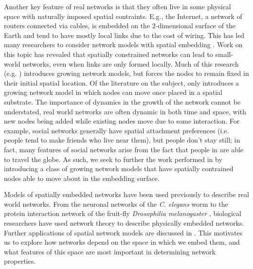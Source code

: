 \documentclass[aps,pre,manuscript,superscriptaddress,amsmath,amssymb,nofootinbib]{revtex4-1}
\begin{document}
Another key feature of real networks is that they often live in some physical space with naturally imposed spatial contraints. 
E.g., the Internet, a network of routers connected via cables, is embedded on the $2$-dimensional surface of the Earth and tend to have mostly local links due to the cost of wiring.
This has led many researchers to consider network models with spatial embedding \cite{ozik2004,przuljgeo,hermannspace,bullockspatial,guan1D,zhang2006,zhang2007}.
Work on this topic has revealed that spatially constrained networks can lead to small-world networks, even when links are only formed locally.
Much of this research (e.g. \cite{bullockspatial,guan1D,przuljgeo}) introduces growing network models, but forces the nodes to remain fixed in their initial spatial location.
Of the literature on the subject, only \cite{ozik2004} introduces a growing network model in which nodes can move once placed in a spatial substrate.
The importance of dynamics in the growth of the network cannot be understated, real world networks are often dynamic in both time and space, with new nodes being added while existing nodes move due to some interaction.
For example, social networks generally have spatial attachment preferences (i.e. people tend to make friends who live near them), but people don't stay still; in fact, many features of social networks arise from the fact that people in are able to travel the globe. 
As such, we seek to further the work performed in \cite{ozik2004} by introducing a class of growing network models that have spatially contrained nodes able to move about in the embedding surface. 

Models of spatially embedded networks have been used previously to describe real world networks.
From the neuronal networks of the \textit{C. elegans} worm \cite{plenzcascade} to the protein interaction network of the fruit-fly \textit{Drosophilia melanogaster} \cite{fruitfly}, biological researchers have used network theory to describe physically embedded networks.
Further applications of spatial network models are discussed in \cite{neuronembedding,barthelemy,vazquez2002}.
This motivates us to explore how networks depend on the space in which we embed them, and what features of this space are most important in determining network properties.
\end{document}
